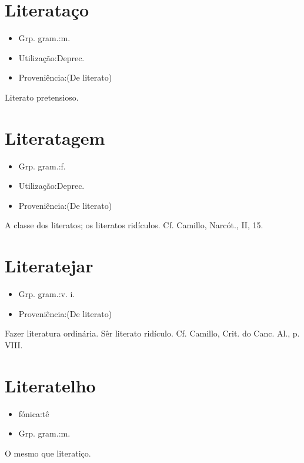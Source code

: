 \section{Literataço}
\begin{itemize}
\item {Grp. gram.:m.}
\end{itemize}
\begin{itemize}
\item {Utilização:Deprec.}
\end{itemize}
\begin{itemize}
\item {Proveniência:(De \textunderscore literato\textunderscore )}
\end{itemize}
Literato pretensioso.
\section{Literatagem}
\begin{itemize}
\item {Grp. gram.:f.}
\end{itemize}
\begin{itemize}
\item {Utilização:Deprec.}
\end{itemize}
\begin{itemize}
\item {Proveniência:(De \textunderscore literato\textunderscore )}
\end{itemize}
A classe dos literatos; os literatos ridículos. Cf. Camillo, \textunderscore Narcót.\textunderscore , II, 15.
\section{Literatejar}
\begin{itemize}
\item {Grp. gram.:v. i.}
\end{itemize}
\begin{itemize}
\item {Proveniência:(De \textunderscore literato\textunderscore )}
\end{itemize}
Fazer literatura ordinária.
Sêr literato ridículo. Cf. Camillo, \textunderscore Crit. do Canc. Al.\textunderscore , p. VIII.
\section{Literatelho}
\begin{itemize}
\item {fónica:tê}
\end{itemize}
\begin{itemize}
\item {Grp. gram.:m.}
\end{itemize}
O mesmo que \textunderscore literatiço\textunderscore .

